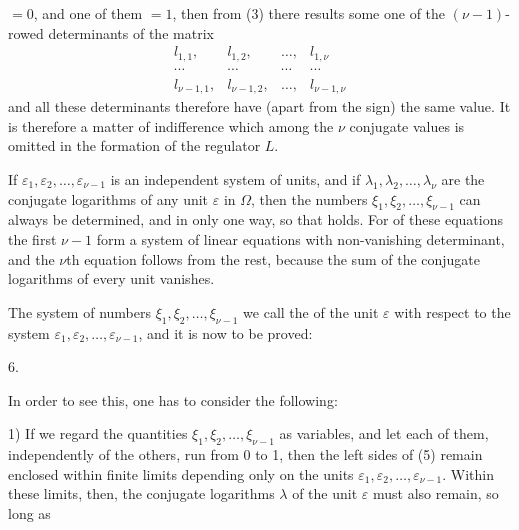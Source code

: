 $= 0$, and one of them $= 1$, then from (3) there results some one of the $(\nu-1)$-rowed determinants of the matrix
\[
\begin{matrix}
l_{1,1}, & l_{1,2}, & \ldots, & l_{1,\nu} \\
\cdots & \cdots & \cdots & \cdots \\
l_{\nu-1,1}, & l_{\nu-1,2}, & \ldots, & l_{\nu-1,\nu}
\end{matrix}
\]
and all these determinants therefore have (apart from the sign) the same value. It is therefore a matter of indifference which among the $\nu$ conjugate values is omitted in the formation of the regulator $L$.

If $\varepsilon_1, \varepsilon_2, \ldots, \varepsilon_{\nu-1}$ is an independent system of units, and if $\lambda_1, \lambda_2, \ldots, \lambda_\nu$ are the conjugate logarithms of any unit $\varepsilon$ in $\Omega$, then the numbers $\xi_1, \xi_2, \ldots, \xi_{\nu-1}$ can always be determined, and in only one way, so that
holds. For of these equations the first $\nu - 1$ form a system of linear equations with non-vanishing determinant, and the $\nu$th equation follows from the rest, because the sum of the conjugate logarithms of every unit vanishes.

The system of numbers $\xi_1, \xi_2, \ldots, \xi_{\nu-1}$ we call the  of the unit $\varepsilon$ with respect to the system $\varepsilon_1, \varepsilon_2, \ldots, \varepsilon_{\nu-1}$, and it is now to be proved:

6. 

In order to see this, one has to consider the following:

1) If we regard the quantities $\xi_1, \xi_2, \ldots, \xi_{\nu-1}$ as variables, and let each of them, independently of the others, run from 0 to 1, then the left sides of (5) remain enclosed within finite limits depending only on the units $\varepsilon_1, \varepsilon_2, \ldots, \varepsilon_{\nu-1}$. Within these limits, then, the conjugate logarithms $\lambda$ of the unit $\varepsilon$ must also remain, so long as
